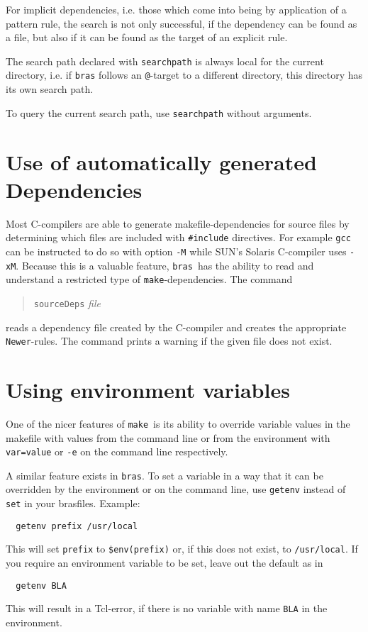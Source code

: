 \documentclass[12pt]{article}
\newcommand{\bras}{\texttt{bras}}
\newcommand{\make}{\texttt{make}}
\begin{document}
For implicit dependencies, i.e. those which come into being by
application of a pattern rule, the search is not only successful, if
the dependency can be found as a file, but also if it can be found as
the target of an explicit rule.

The search path declared with \texttt{searchpath} is always local for
the current directory, i.e. if \bras{} follows an \texttt{@}-target to
a different directory, this directory has its own search path.

To query the current search path, use \texttt{searchpath} without
arguments. 

\section{Use of automatically generated Dependencies}

Most C-compilers are able to generate makefile-dependencies for
source files by determining which files are included with
\texttt{\#include} directives. For example \texttt{gcc} can be
instructed to do so with option \texttt{-M} while SUN's Solaris
C-compiler uses \texttt{-xM}. Because this is a valuable feature,
\bras\ has the ability to read and understand a restricted type of
\make-dependencies. The command
\begin{quote}
  \texttt{sourceDeps} \textit{file}
\end{quote}
reads a dependency file created by the C-compiler and creates the
appropriate \texttt{Newer}-rules. The command prints a warning if
the given file does not exist.
\section{Using environment variables}
One of the nicer features of \make\ is its ability to override
variable values in the makefile with values from the command line or
from the environment with \texttt{var=value} or \texttt{-e}
on the command line respectively. 

A similar feature exists in \bras. To set a variable in a way that it
can be overridden by the environment or on the command line, use
\texttt{getenv} instead of \texttt{set} in your brasfiles. Example:
\begin{verbatim}
  getenv prefix /usr/local
\end{verbatim}
This will set \texttt{prefix} to \texttt{\$env(prefix)} or, if this does
not exist, to \texttt{/usr/local}. If you require an environment
variable to be set, leave out the default as in
\begin{verbatim}
  getenv BLA
\end{verbatim}
This will result in a Tcl-error, if there is no variable with name
\texttt{BLA} in the environment.
\end{document}
